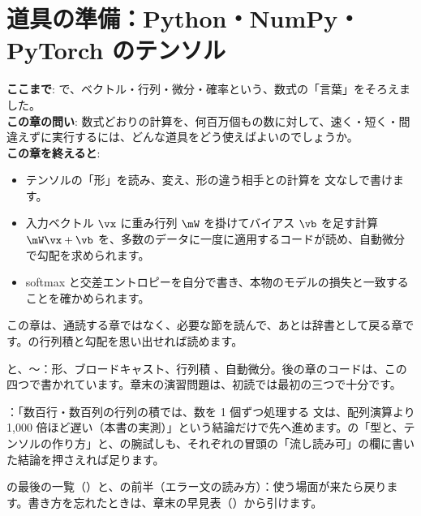 \chapter{道具の準備：Python・NumPy・PyTorch のテンソル}\label{ch:pytorch}

\begin{chapterlead}
\textbf{ここまで}: で、ベクトル・行列・微分・確率という、数式の「言葉」をそろえました。\\[1mm]
\textbf{この章の問い}: 数式どおりの計算を、何百万個もの数に対して、速く・短く・間違えずに実行するには、どんな道具をどう使えばよいのでしょうか。\\[1mm]
\textbf{この章を終えると}:
\begin{itemize}
\item テンソルの「形」を読み、変え、形の違う相手との計算を  文なしで書けます。
\item 入力ベクトル $\vx$ に重み行列 $\mW$ を掛けてバイアス $\vb$ を足す計算 $\mW\vx+\vb$ を、多数のデータに一度に適用するコードが読め、自動微分で勾配を求められます。
\item softmax と交差エントロピーを自分で書き、本物のモデルの損失と一致することを確かめられます。
\end{itemize}
\end{chapterlead}

\begin{readingguide}
\item[\rgpre] この章は、通読する章ではなく、必要な節を読んで、あとは辞書として戻る章です。の行列積と勾配を思い出せれば読めます。
\item[\rgmust] と、〜：形、ブロードキャスト、行列積 、自動微分。後の章のコードは、この四つで書かれています。章末の演習問題は、初読では最初の三つで十分です。
\item[\rgskim] ：「数百行・数百列の行列の積では、数を 1 個ずつ処理する  文は、配列演算より 1,000 倍ほど遅い（本書の実測）」という結論だけで先へ進めます。の「型と、テンソルの作り方」と、の腕試しも、それぞれの冒頭の「流し読み可」の欄に書いた結論を押さえれば足ります。
\item[\rglater] の最後の一覧（）と、の前半（エラー文の読み方）：使う場面が来たら戻ります。書き方を忘れたときは、章末の早見表（）から引けます。
\end{readingguide}

